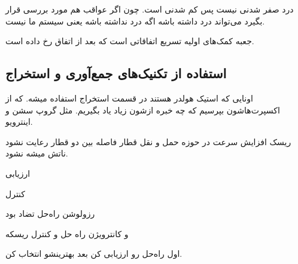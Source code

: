 درد صفر شدنی نیست پس کم شدنی است. چون اگر عواقب هم مورد بررسی قرار بگیرد
می‌تواند درد داشته باشه اگه درد نداشته باشه یعنی سیستم ما نیست.

جعبه کمک‌های اولیه تسریع اتفاقاتی است که بعد از اتفاق رخ داده است.

\subsection{استفاده از تکنیک‌های جمع‌آوری و استخراج}

اونایی که استیک هولدر هستند در قسمت استخراج استفاده میشه. که از اکسپرت‌هاشون
بپرسیم که چه خبره ازشون زیاد یاد بگیریم. مثل گروپ سشن و اینترویو.

ریسک افزایش سرعت در حوزه حمل و نقل قطار
فاصله بین دو قطار رعایت نشود
ناتش میشه نشود.

ارزیابی

کنترل

رزولوشن راه‌حل تضاد بود

و کانترویژن راه حل و کنترل ریسکه

اول راه‌حل رو ارزیابی کن
بعد بهترینشو انتخاب کن.
